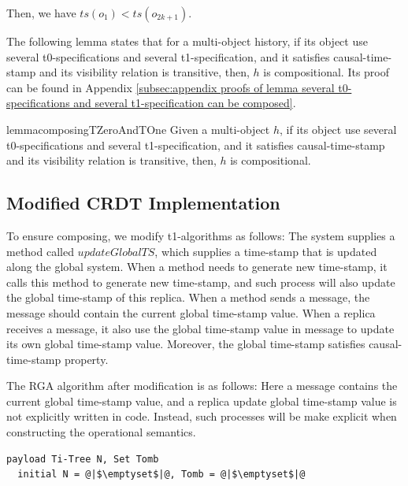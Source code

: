 {Then, we have $\mathit{ts}(o_1) < \mathit{ts}(o_{\mathit{2k+1}})$.

The following lemma states that for a multi-object history, if its object use several t0-specifications and several t1-specification, and it satisfies causal-time-stamp and its visibility relation is transitive, then, $h$ is compositional. Its proof can be found in Appendix \ref{subsec:appendix proofs of lemma several t0-specifications and several t1-specification can be composed}.

\begin{restatable}{lemma}{composingTZeroAndTOne}
\label{lemma:several t0-specifications and several t1-specification can be composed}
Given a multi-object $h$, if its object use several t0-specifications and several t1-specification, and it satisfies causal-time-stamp and its visibility relation is transitive, then, $h$ is compositional.
\end{restatable}






\subsection{Modified CRDT Implementation}
\label{subsec:modified CRDT implementation}

To ensure composing, we modify t1-algorithms as follows: The system supplies a method called $\mathit{updateGlobalTS}$, which supplies a time-stamp that is updated along the global system. When a method needs to generate new time-stamp, it calls this method to generate new time-stamp, and such process will also update the global time-stamp of this replica. When a method sends a message, the message should contain the current global time-stamp value. When a replica receives a message, it also use the global time-stamp value in message to update its own global time-stamp value. Moreover, the global time-stamp satisfies causal-time-stamp property.

The RGA algorithm after modification is as follows: Here a message contains the current global time-stamp value, and a replica update global time-stamp value is not explicitly written in code. Instead, such processes will be make explicit when constructing the operational semantics.

\begin{lstlisting}[caption={Pseudo-code of the Modified RGA}, captionpos=b,label={lst:modifier rga}]
  payload Ti-Tree N, Set Tomb
  initial N = @|$\emptyset$|@, Tomb = @|$\emptyset$|@


\end{lstlisting}}

